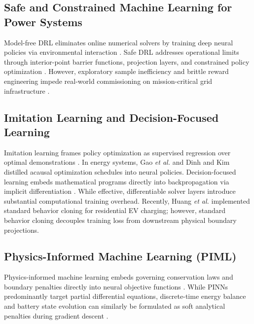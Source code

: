 \documentclass[journal]{IEEEtran}
\theoremstyle{remark}
\begin{document}
\subsection{Safe and Constrained Machine Learning for Power Systems}
Model-free DRL eliminates online numerical solvers by training deep neural policies via environmental interaction \cite{wan2019}. Safe DRL addresses operational limits through interior-point barrier functions, projection layers, and constrained policy optimization \cite{li2020, qiu2020}. However, exploratory sample inefficiency and brittle reward engineering impede real-world commissioning on mission-critical grid infrastructure \cite{yan2021}.

\subsection{Imitation Learning and Decision-Focused Learning}
Imitation learning frames policy optimization as supervised regression over optimal demonstrations \cite{osa2018}. In energy systems, Gao \textit{et al.} \cite{gao2022} and Dinh and Kim \cite{dinh2022} distilled acausal optimization schedules into neural policies. Decision-focused learning embeds mathematical programs directly into backpropagation via implicit differentiation \cite{donti2021}. While effective, differentiable solver layers introduce substantial computational training overhead. Recently, Huang \textit{et al.} \cite{huang2024} implemented standard behavior cloning for residential EV charging; however, standard behavior cloning decouples training loss from downstream physical boundary projections.

\subsection{Physics-Informed Machine Learning (PIML)}
Physics-informed machine learning embeds governing conservation laws and boundary penalties directly into neural objective functions \cite{raissi2019, karniadakis2021}. While PINNs predominantly target partial differential equations, discrete-time energy balance and battery state evolution can similarly be formulated as soft analytical penalties during gradient descent \cite{donti2021}.
\end{document}
